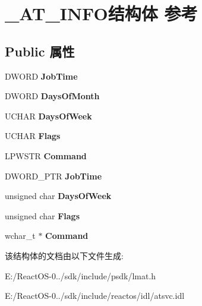 \hypertarget{struct___a_t___i_n_f_o}{}\section{\+\_\+\+A\+T\+\_\+\+I\+N\+F\+O结构体 参考}
\label{struct___a_t___i_n_f_o}
\subsection*{Public 属性}
\begin{DoxyCompactItemize}
\item 
\mbox{\label{struct___a_t___i_n_f_o_a5ea8327a5569407f4f2e5790b6fb4595}} 
D\+W\+O\+RD {\bfseries Job\+Time}
\item 
\mbox{\label{struct___a_t___i_n_f_o_a4d4aa4707accd4941cd90086b345bf8f}} 
D\+W\+O\+RD {\bfseries Days\+Of\+Month}
\item 
\mbox{\label{struct___a_t___i_n_f_o_a35b5780be1ec77350528a35e16c985e2}} 
U\+C\+H\+AR {\bfseries Days\+Of\+Week}
\item 
\mbox{\label{struct___a_t___i_n_f_o_a0a996634d4f025f6e5717d85b2618a7b}} 
U\+C\+H\+AR {\bfseries Flags}
\item 
\mbox{\label{struct___a_t___i_n_f_o_a2cb381d0c35cf0df345c728d95fe6f33}} 
L\+P\+W\+S\+TR {\bfseries Command}
\item 
\mbox{\label{struct___a_t___i_n_f_o_a9dcf30de4acdb380109275a13ff8db5c}} 
D\+W\+O\+R\+D\+\_\+\+P\+TR {\bfseries Job\+Time}
\item 
\mbox{\label{struct___a_t___i_n_f_o_a80ec17d614bfc0d1eeb1ad1011cfd388}} 
unsigned char {\bfseries Days\+Of\+Week}
\item 
\mbox{\label{struct___a_t___i_n_f_o_a5cf55588f4aefa8cedd2dc98e3f51150}} 
unsigned char {\bfseries Flags}
\item 
\mbox{\label{struct___a_t___i_n_f_o_a2191166ae45f3a81af92bfb139e19916}} 
wchar\+\_\+t $\ast$ {\bfseries Command}
\end{DoxyCompactItemize}


该结构体的文档由以下文件生成\+:\begin{DoxyCompactItemize}
\item 
E\+:/\+React\+O\+S-\/0../sdk/include/psdk/lmat.\+h\item 
E\+:/\+React\+O\+S-\/0../sdk/include/reactos/idl/atsvc.\+idl\end{DoxyCompactItemize}
